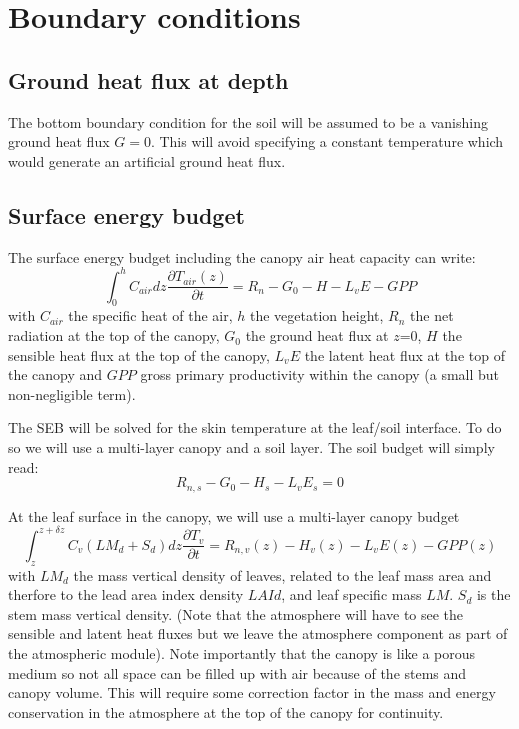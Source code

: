 \documentclass{article}
\begin{document}
\section{Boundary conditions}
\subsection{Ground heat flux at depth}
The bottom boundary condition for the soil will be assumed to be a vanishing ground heat flux $G=0$. This will avoid specifying a constant temperature which would generate an artificial ground heat flux.

\subsection{Surface energy budget}
The surface energy budget including the canopy air heat capacity can write:
\begin{equation}
    \int_0^h{C_{air}dz \frac{\partial T_{air}(z)}{\partial t}} = R_n - G_0 - H - L_vE - GPP 
\end{equation}
with $C_{air}$ the specific heat of the air, $h$ the vegetation height, $R_n$ the net radiation at the top of the canopy, $G_0$ the ground heat flux at $z$=0, $H$ the sensible heat flux at the top of the canopy, $L_vE$ the latent heat flux at the top of the canopy and $GPP$ gross primary productivity within the canopy (a small but non-negligible term).

 The SEB will be solved for the skin temperature at the leaf/soil interface. To do so we will use a multi-layer canopy and a soil layer.
The soil budget will simply read:
\begin{equation}
     R_{n,s} - G_0 - H_s - L_vE_s = 0  
\end{equation}

At the leaf surface in the canopy, we will use a multi-layer canopy budget
\begin{equation}
    \int_z^{z+\delta z}{C_v (LM_d+S_d) dz\frac{\partial T_v}{\partial t}} = R_{n,v}(z) -H_v(z)-L_vE(z)-GPP(z)
\end{equation}
with $LM_d$ the mass vertical density of leaves, related to the leaf mass area and therfore to the lead area index density $LAId$, and leaf specific mass $LM$. $S_d$ is the stem mass vertical density.
(Note that the atmosphere will have to see the sensible and latent heat fluxes but we leave the atmosphere component as part of the atmospheric module). Note importantly that the canopy is like a porous medium so not all space can be filled up with air because of the stems and canopy volume. This will require some correction factor in the mass and energy conservation in the atmosphere at the top of the canopy for continuity.
\end{document}
